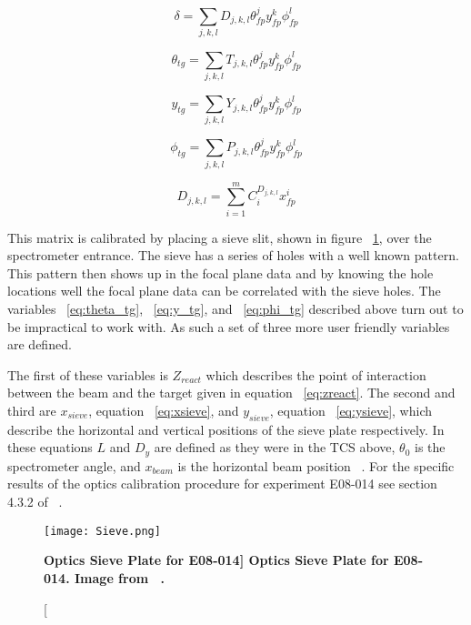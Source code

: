 \begin{equation} \label{eq:delta_tg}
	\delta = \sum_{j,k,l} D_{j,k,l} \theta_{fp}^j y_{fp}^k \phi_{fp}^l
\end{equation}

\begin{equation} \label{eq:theta_tg}
	\theta_{tg} = \sum_{j,k,l} T_{j,k,l} \theta_{fp}^j y_{fp}^k \phi_{fp}^l
\end{equation}

\begin{equation} \label{eq:y_tg}
	y_{tg} = \sum_{j,k,l} Y_{j,k,l} \theta_{fp}^j y_{fp}^k \phi_{fp}^l
\end{equation}

\begin{equation} \label{eq:phi_tg}
	\phi_{tg} = \sum_{j,k,l} P_{j,k,l} \theta_{fp}^j y_{fp}^k \phi_{fp}^l
\end{equation}

\begin{equation} \label{eq:tensor}
	D_{j,k,l} = \sum_{i=1}^m C_i^{D_{j,k,l}} x_{fp}^i
\end{equation}

This matrix is calibrated by placing a sieve slit, shown in figure ~\ref{fig:sieve}, over the spectrometer entrance. The sieve has a series of holes with a well known pattern. This pattern then shows up in the focal plane data and by knowing the hole locations well the focal plane data can be correlated with the sieve holes.  The variables ~\ref{eq:theta_tg}, ~\ref{eq:y_tg}, and ~\ref{eq:phi_tg} described above turn out to be impractical to work with. As such a set of three more user friendly variables are defined. 

The first of these variables is $Z_{react}$ which describes the point of interaction between the beam and the target given in equation ~\ref{eq:zreact}. The second and third are $x_{sieve}$, equation ~\ref{eq:xsieve}, and $y_{sieve}$, equation ~\ref{eq:ysieve}, which describe the horizontal and vertical positions of the sieve plate respectively. In these equations $L$ and $D_y$ are defined as they were in the TCS above, $\theta_0$ is the spectrometer angle, and $x_{beam}$ is the horizontal beam position ~\cite{optics}. For the specific results of the optics calibration procedure for experiment E08-014 see section 4.3.2 of ~\cite{Thesis:Ye}.

\begin{figure}[!ht]
\begin{center}
\texttt{[image: Sieve.png]}
\end{center}
\caption[\bf{Optics Sieve Plate for E08-014}]{
{\bf{Optics Sieve Plate for E08-014.}} Image from ~\cite{Thesis:Ye}.}
\label{fig:sieve}
\end{figure}

